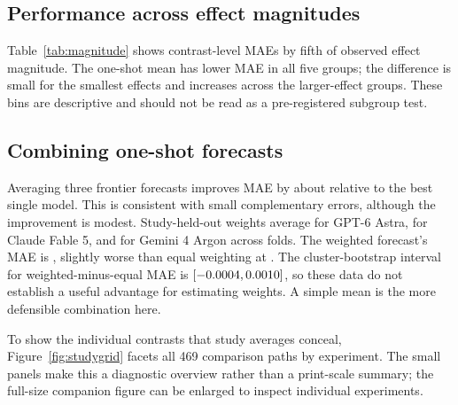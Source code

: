 \documentclass[11pt]{article}
\begin{document}
\begin{table}[t]
\centering
\small
\caption{Forecast performance on 469 contrasts in 70 studies. Lower MAE is better.}
\label{tab:main}

\end{table}

\subsection{Performance across effect magnitudes}
Table~\ref{tab:magnitude} shows contrast-level MAEs by fifth of observed effect magnitude. The one-shot mean has lower MAE in all five groups; the difference is small for the smallest effects and increases across the larger-effect groups. These bins are descriptive and should not be read as a pre-registered subgroup test.

\begin{table}[t]
\centering
\small
\caption{MAE by fifth of observed effect magnitude. The bins contain approximately equal numbers of contrasts.}
\label{tab:magnitude}

\end{table}

\subsection{Combining one-shot forecasts}
Averaging three frontier forecasts improves MAE by about \BestSingleGain{} relative to the best single model. This is consistent with small complementary errors, although the improvement is modest. Study-held-out weights average \AstraFoldWeight{} for GPT-6 Astra, \ClaudeFoldWeight{} for Claude Fable 5, and \GeminiFoldWeight{} for Gemini 4 Argon across folds. The weighted forecast's MAE is \WeightedMAE{}, slightly worse than equal weighting at \EqualMAE{}. The cluster-bootstrap interval for weighted-minus-equal MAE is $[-0.0004{},0.0010{}]$, so these data do not establish a useful advantage for estimating weights. A simple mean is the more defensible combination here.

To show the individual contrasts that study averages conceal, Figure~\ref{fig:studygrid} facets all 469 comparison paths by experiment. The small panels make this a diagnostic overview rather than a print-scale summary; the full-size companion figure can be enlarged to inspect individual experiments.
\end{document}
